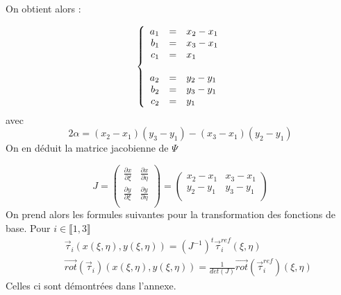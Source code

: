\documentclass[a4paper,12pt]{article}
\begin{document}
On obtient alors :

\[
\left\{
\begin{array}{r c l}
a_{1} &=&  x_{2} - x_{1}\\
b_{1} &=&  x_{3} - x_{1}\\
c_{1} &=&  x_{1}\\
\\
a_{2} &=&  y_{2} - y_{1}\\
b_{2} &=&  y_{3} - y_{1}\\
c_{2} &=&  y_{1}\\
\end{array}
\right.
\]
avec
\[
2\alpha = (x_{2} - x_{1})(y_{3}-y_{1}) - (x_{3} - x_{1})(y_{2}-y_{1})
\]
On en déduit la matrice jacobienne de $\Psi$

\[
J =
\begin{pmatrix}
\frac{\partial x}{\partial \xi} & \frac{\partial x}{\partial \eta} \\
\frac{\partial y}{\partial \xi} & \frac{\partial y}{\partial \eta} \\
\end{pmatrix}
=
\begin{pmatrix}
x_{2} - x_{1} & x_{3} - x_{1} \\
y_{2} - y_{1} & y_{3} - y_{1} \\
\end{pmatrix}
\]
On prend alors les formules suivantes pour la transformation des fonctions de base. Pour $i \in \llbracket 1,3 \rrbracket$
\begin{eqnarray*}
& &\vec{\tau}_{i}(x(\xi, \eta),y(\xi, \eta)) = (J^{-1})^{t}\vec{\tau}_{i}^{ref}(\xi, \eta) \\
& &\vec{rot}(\vec{\tau}_{i})(x(\xi, \eta),y(\xi, \eta)) = \frac{1}{det(J)}\vec{rot}(\vec{\tau}_{i}^{ref})(\xi, \eta)
\end{eqnarray*}
Celles ci sont démontrées dans l'annexe.
\end{document}
